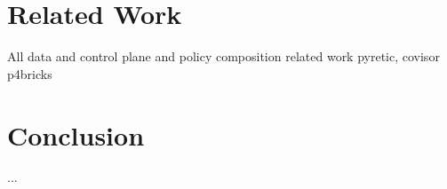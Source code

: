 \documentclass[10pt,sigconf,letterpaper,anonymous]{acmart}
\begin{document}
\section{Related Work}

All data and control plane and policy composition related work 
pyretic, covisor
p4bricks
\section{Conclusion}

\begin{acks}
...
\end{acks}




\end{document}
